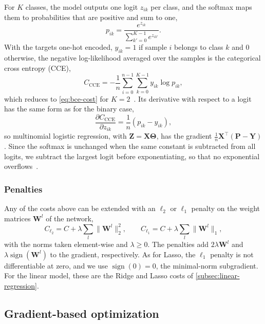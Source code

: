 For $K$ classes, the model outputs one logit $z_{ik}$ per class, and the softmax maps them
to probabilities that are positive and sum to one,
\begin{equation}\label{eq:softmax}
    p_{ik} = \frac{e^{z_{ik}}}{\sum_{k'=0}^{K-1} e^{z_{ik'}}}.
\end{equation}
With the targets one-hot encoded, $y_{ik} = 1$ if sample $i$ belongs to class $k$ and $0$
otherwise, the negative log-likelihood averaged over the samples is the categorical cross
entropy (CCE),
\begin{equation}\label{eq:cce-cost}
    C_\text{CCE} = -\frac{1}{n}\sum_{i=0}^{n-1}\sum_{k=0}^{K-1} y_{ik}\log p_{ik},
\end{equation}
which reduces to \cref{eq:bce-cost} for $K = 2$~\cite{hjorth-jensen_2026}. Its derivative
with respect to a logit has the same form as for the binary case,
\begin{equation}\label{eq:cce-gradient}
    \frac{\partial C_\text{CCE}}{\partial z_{ik}} = \frac{1}{n}\left(p_{ik} - y_{ik}\right),
\end{equation}
so multinomial logistic regression, with $\bm{Z} = \bm{X}\bm{\Theta}$, has the gradient
$\frac{1}{n}\bm{X}^\top(\bm{P} - \bm{Y})$. Since the softmax is unchanged when the same
constant is subtracted from all logits, we subtract the largest logit before
exponentiating, so that no exponential overflows~\cite{hjorth-jensen_2026}.

\subsubsection{Penalties}
Any of the costs above can be extended with an $\ell_2$ or $\ell_1$ penalty on the weight
matrices $\bm{W}^l$ of the network,
\begin{equation}\label{eq:penalties}
    C_{\ell_2} = C + \lambda\sum_{l}\lVert \bm{W}^l\rVert_2^2, \qquad
    C_{\ell_1} = C + \lambda\sum_{l}\lVert \bm{W}^l\rVert_1,
\end{equation}
with the norms taken element-wise and $\lambda \geq 0$. The penalties add $2\lambda\bm{W}^l$
and $\lambda\operatorname{sign}(\bm{W}^l)$ to the gradient, respectively. As for Lasso, the
$\ell_1$ penalty is not differentiable at zero, and we use $\operatorname{sign}(0) = 0$,
the minimal-norm subgradient. For the linear model, these are the Ridge and Lasso costs of
\cref{subsec:linear-regression}.

\subsection{Gradient-based optimization}\label{subsec:optimization}

